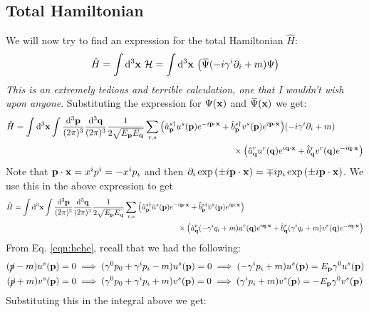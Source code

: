 \subsection{Total Hamiltonian}
We will now try to find an expression for the total Hamiltonian $\hat{H}$:
$$\hat{H} = \int \dd^3 \vb{x}\ \SH =  \int \dd^3 \vb{x}\ \qty( \dadj{\Psi} (-i \gamma^i \partial_i + m )\Psi)$$
\textit{This is an extremely tedious and terrible calculation, one that I wouldn't wish upon anyone}. Substituting the expression for $\Psi(\vb{x})$ and $\dadj{\Psi}{(\vb{x})}$ we get:
\begin{align*}
   \hat{H} &= \int \dd^3 \vb{x}\int \frac{\dd^3\vb{{\vb{p}}}}{(2\pi)^3} \frac{\dd^3\vb{{\vb{q}}}}{(2\pi)^3} \frac{1}{2\sqrt{E_{\vb{p}}E_{\vb{q}}}} \sum \limits_{r,s} \qty({\hat{a}_{\vb{p}}}^{s\dagger} u^s(\vb{p}) e^{-i \vb{p}\cdot \vb{x}} +{\hat{b}_{\vb{p}}}^{s\dagger} v^s(\vb{p}) e^{i \vb{p}\cdot \vb{x}})(-i \gamma^i \partial_i + m )\\ &\qquad\qquad\qquad\qquad\qquad\qquad\qquad\qquad\qquad\qquad\qquad\qquad\quad \times \qty({\hat{a}_{\vb{q}}}^{r} u^r(\vb{q}) e^{i \vb{q}\cdot \vb{x}} +{\hat{b}_{\vb{q}}}^{r} v^r(\vb{q}) e^{-i \vb{q}\cdot \vb{x}})
\end{align*}
Note that $\vb{p}\cdot \vb{x} = x^ip^i = -x^ip_i$ and then $\partial_i \exp \qty(\pm i \vb{p}\cdot \vb{x}) = \mp i p_i \exp \qty(\pm i\vb{p}\cdot \vb{x}) $. We use this in the above expression to get
\begin{align*}
   \hat{H} &= \int \dd^3 \vb{x}\int \meas{\vb{p}} \meas{\vb{q}} \frac{1}{2\sqrt{E_{\vb{p}}E_{\vb{q}}}} \sum \limits_{r,s} \qty(\creap \dadj{u}^s(\vb{p}) e^{-i \pdx} +\crebp \dadj{v}^s(\vb{p}) e^{i \pdx})\\ &\qquad\qquad\qquad\qquad\qquad\qquad\qquad\qquad\qquad\qquad\qquad\times \qty(\annaqr(-\gamma^i q_i +m) u^r(\vb{q}) e^{i \qdx} +\annbqr(\gamma^i q_i +m) v^r(\vb{q}) e^{-i \qdx})
\end{align*}
From Eq. \ref{eqn:hehe}, recall that we had the following:
\begin{align*}
   (\cancel{p}-m)u^s(\vb{p})&=0\implies (\gamma^0p_0+\gamma^ip_i -m)u^s(\vb{p})=0 \implies (-\gamma^ip_i+m)u^s(\vb{p}) = E_{\vb{p}}\gamma^0 u^s(\vb{p})\\
(\cancel{p}+m)v^s(\vb{p})&=0\implies (\gamma^0p_0+\gamma^ip_i +m)v^s(\vb{p})=0 \implies (\gamma^ip_i+m)v^s(\vb{p}) = -E_{\vb{p}}\gamma^0 v^s(\vb{p})
\end{align*}
Substituting this in the integral above we get:
